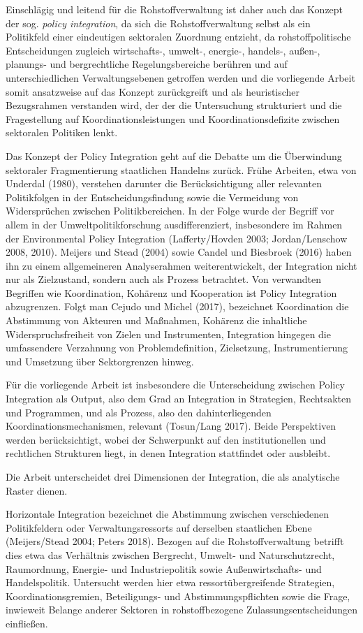 \documentclass[12pt,a4paper,oneside]{book} %
\begin{document}
Einschlägig und leitend für die Rohstoffverwaltung ist daher auch das Konzept der sog. \textit{policy integration}, da sich die Rohstoffverwaltung selbst als ein Politikfeld einer eindeutigen sektoralen Zuordnung entzieht, da rohstoffpolitische Entscheidungen zugleich wirtschafts-, umwelt-, energie-, handels-, außen-, planungs- und bergrechtliche Regelungsbereiche berühren und auf unterschiedlichen Verwaltungsebenen getroffen werden und die vorliegende Arbeit somit ansatzweise auf das Konzept zurückgreift und als heuristischer Bezugsrahmen verstanden wird, der der die Untersuchung strukturiert und die Fragestellung auf Koordinationsleistungen und Koordinationsdefizite zwischen sektoralen Politiken lenkt.

Das Konzept der Policy Integration geht auf die Debatte um die Überwindung sektoraler Fragmentierung staatlichen Handelns zurück. Frühe Arbeiten, etwa von Underdal (1980), verstehen darunter die Berücksichtigung aller relevanten Politikfolgen in der Entscheidungsfindung sowie die Vermeidung von Widersprüchen zwischen Politikbereichen. In der Folge wurde der Begriff vor allem in der Umweltpolitikforschung ausdifferenziert, insbesondere im Rahmen der Environmental Policy Integration (Lafferty/Hovden 2003; Jordan/Lenschow 2008, 2010). Meijers und Stead (2004) sowie Candel und Biesbroek (2016) haben ihn zu einem allgemeineren Analyserahmen weiterentwickelt, der Integration nicht nur als Zielzustand, sondern auch als Prozess betrachtet. Von verwandten Begriffen wie Koordination, Kohärenz und Kooperation ist Policy Integration abzugrenzen. Folgt man Cejudo und Michel (2017), bezeichnet Koordination die Abstimmung von Akteuren und Maßnahmen, Kohärenz die inhaltliche Widerspruchsfreiheit von Zielen und Instrumenten, Integration hingegen die umfassendere Verzahnung von Problemdefinition, Zielsetzung, Instrumentierung und Umsetzung über Sektorgrenzen hinweg.

Für die vorliegende Arbeit ist insbesondere die Unterscheidung zwischen Policy Integration als Output, also dem Grad an Integration in Strategien, Rechtsakten und Programmen, und als Prozess, also den dahinterliegenden Koordinationsmechanismen, relevant (Tosun/Lang 2017). Beide Perspektiven werden berücksichtigt, wobei der Schwerpunkt auf den institutionellen und rechtlichen Strukturen liegt, in denen Integration stattfindet oder ausbleibt.

Die Arbeit unterscheidet drei Dimensionen der Integration, die als analytische Raster dienen.

Horizontale Integration bezeichnet die Abstimmung zwischen verschiedenen Politikfeldern oder Verwaltungsressorts auf derselben staatlichen Ebene (Meijers/Stead 2004; Peters 2018). Bezogen auf die Rohstoffverwaltung betrifft dies etwa das Verhältnis zwischen Bergrecht, Umwelt- und Naturschutzrecht, Raumordnung, Energie- und Industriepolitik sowie Außenwirtschafts- und Handelspolitik. Untersucht werden hier etwa ressortübergreifende Strategien, Koordinationsgremien, Beteiligungs- und Abstimmungspflichten sowie die Frage, inwieweit Belange anderer Sektoren in rohstoffbezogene Zulassungsentscheidungen einfließen.
\end{document}
